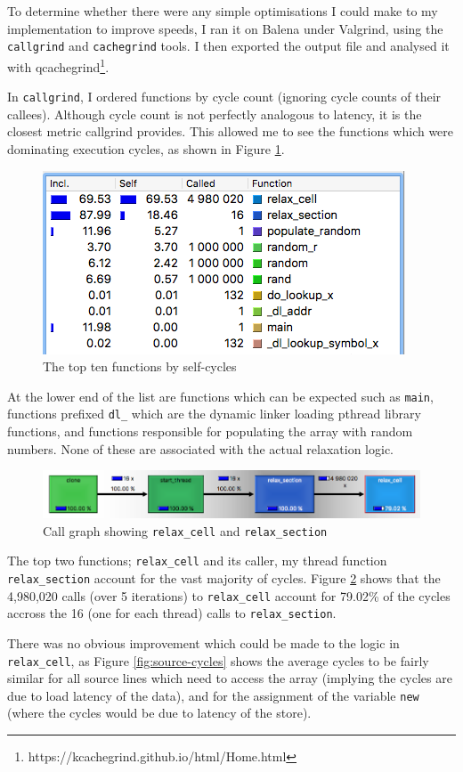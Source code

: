 \documentclass[12pt]{article}
\begin{document}
To determine whether there were any simple optimisations I could make to my implementation to improve speeds, I ran it on Balena under Valgrind, using the \texttt{callgrind} and \texttt{cachegrind} tools. I then exported the output file and analysed it with qcachegrind\footnote{https://kcachegrind.github.io/html/Home.html}.

In \texttt{callgrind}, I ordered functions by cycle count (ignoring cycle counts of their callees). Although cycle count is not perfectly analogous to latency, it is the closest metric callgrind provides. This allowed me to see the functions which were dominating execution cycles, as shown in Figure \ref{fig:top-cycles}.
\begin{figure}[!htb]
\centering
\includegraphics[width=.5\textwidth]{img/top-ten.png}
\caption{The top ten functions by self-cycles}
\label{fig:top-cycles}
\end{figure}
At the lower end of the list are functions which can be expected such as \texttt{main}, functions prefixed \texttt{dl\_} which are the dynamic linker loading pthread library functions, and functions responsible for populating the array with random numbers. None of these are associated with the actual relaxation logic. 
\begin{figure}[!htb]
\hspace{-0.7cm}\includegraphics[width=1.1\textwidth]{img/cg.png}
\caption{Call graph showing \texttt{relax\_cell} and \texttt{relax\_section}}
\label{fig:cg}
\end{figure}
The top two functions; \texttt{relax\_cell} and its caller, my thread function \texttt{relax\_section} account for the vast majority of cycles. Figure \ref{fig:cg} shows that the 4,980,020 calls (over 5 iterations) to \texttt{relax\_cell} account for 79.02\% of the cycles accross the 16 (one for each thread) calls to  \texttt{relax\_section}.
\clearpage

There was no obvious improvement which could be made to the logic in \texttt{relax\_cell}, as Figure \ref{fig:source-cycles} shows the average cycles to be fairly similar for all source lines which need to access the array (implying the cycles are due to load latency of the data), and for the assignment of the variable \texttt{new} (where the cycles would be due to latency of the store).
\end{document}
